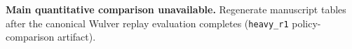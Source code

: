 \begin{table}[t]
\centering
\caption{\textbf{Main quantitative comparison unavailable.} Regenerate manuscript tables after the canonical Wulver replay evaluation completes (\texttt{heavy\_r1} policy-comparison artifact).}
\label{tab:main-comparison-unavailable}

\end{table}
